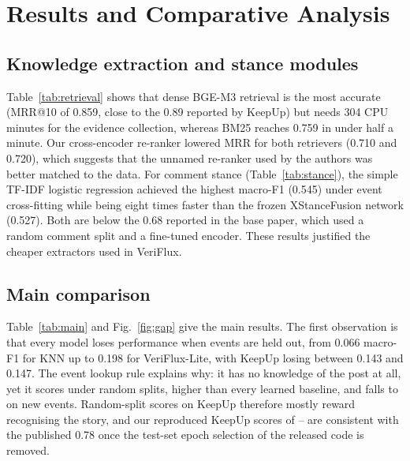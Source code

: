 \documentclass[conference]{IEEEtran}
\begin{document}
\section{Results and Comparative Analysis}
\label{sec:results}
\subsection{Knowledge extraction and stance modules}
Table~\ref{tab:retrieval} shows that dense BGE-M3 retrieval is the most accurate (MRR@10 of 0.859, close to the
0.89 reported by KeepUp) but needs 304 CPU minutes for the evidence collection, whereas BM25 reaches 0.759 in
under half a minute. Our cross-encoder re-ranker lowered MRR for both retrievers (0.710 and 0.720), which suggests
that the unnamed re-ranker used by the authors was better matched to the data. For comment stance
(Table~\ref{tab:stance}), the simple TF-IDF logistic regression achieved the highest macro-F1 (0.545) under
event cross-fitting while being eight times faster than the frozen XStanceFusion network (0.527). Both are below
the 0.68 reported in the base paper, which used a random comment split and a fine-tuned encoder. These results
justified the cheaper extractors used in VeriFlux.




\subsection{Main comparison}
Table~\ref{tab:main} and Fig.~\ref{fig:gap} give the main results. The first observation is that every model
loses performance when events are held out, from 0.066 macro-F1 for KNN up to 0.198 for VeriFlux-Lite, with
KeepUp losing between 0.143 and 0.147. The event lookup rule explains why: it has no knowledge of the post at all,
yet it scores \LookupRandomFone{} under random splits, higher than every learned baseline, and falls to
\LookupEventFone{} on new events. Random-split scores on KeepUp therefore mostly reward recognising the story,
and our reproduced KeepUp scores of \KUrandomFone{}--\KUseqrandomFone{} are consistent with the published 0.78
once the test-set epoch selection of the released code is removed.
\end{document}
